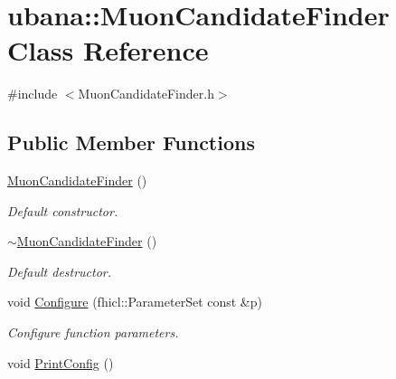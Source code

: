 \hypertarget{classubana_1_1MuonCandidateFinder}{\section{ubana\-:\-:Muon\-Candidate\-Finder Class Reference}
\label{classubana_1_1MuonCandidateFinder}
}


{\ttfamily \#include $<$Muon\-Candidate\-Finder.\-h$>$}

\subsection*{Public Member Functions}
\begin{DoxyCompactItemize}
\item 
\hypertarget{classubana_1_1MuonCandidateFinder_a6dff5780726e46fc5ad43f41bdbc0a97}{\hyperlink{classubana_1_1MuonCandidateFinder_a6dff5780726e46fc5ad43f41bdbc0a97}{Muon\-Candidate\-Finder} ()}\label{classubana_1_1MuonCandidateFinder_a6dff5780726e46fc5ad43f41bdbc0a97}

\begin{DoxyCompactList}\small\item\em Default constructor. \end{DoxyCompactList}\item 
\hypertarget{classubana_1_1MuonCandidateFinder_aa84c2c422211c74d00eb61cc221d8c07}{\hyperlink{classubana_1_1MuonCandidateFinder_aa84c2c422211c74d00eb61cc221d8c07}{$\sim$\-Muon\-Candidate\-Finder} ()}\label{classubana_1_1MuonCandidateFinder_aa84c2c422211c74d00eb61cc221d8c07}

\begin{DoxyCompactList}\small\item\em Default destructor. \end{DoxyCompactList}\item 
\hypertarget{classubana_1_1MuonCandidateFinder_a97d58ef9b5d26a6ccddc18f507ada1b1}{void \hyperlink{classubana_1_1MuonCandidateFinder_a97d58ef9b5d26a6ccddc18f507ada1b1}{Configure} (fhicl\-::\-Parameter\-Set const \&p)}\label{classubana_1_1MuonCandidateFinder_a97d58ef9b5d26a6ccddc18f507ada1b1}

\begin{DoxyCompactList}\small\item\em Configure function parameters. \end{DoxyCompactList}\item 
\hypertarget{classubana_1_1MuonCandidateFinder_ae5aaa85fb815cd30fe1048ea5cdd387d}{void \hyperlink{classubana_1_1MuonCandidateFinder_ae5aaa85fb815cd30fe1048ea5cdd387d}{Print\-Config} ()}\label{classubana_1_1MuonCandidateFinder_ae5aaa85fb815cd30fe1048ea5cdd387d}


\end{DoxyCompactItemize}
